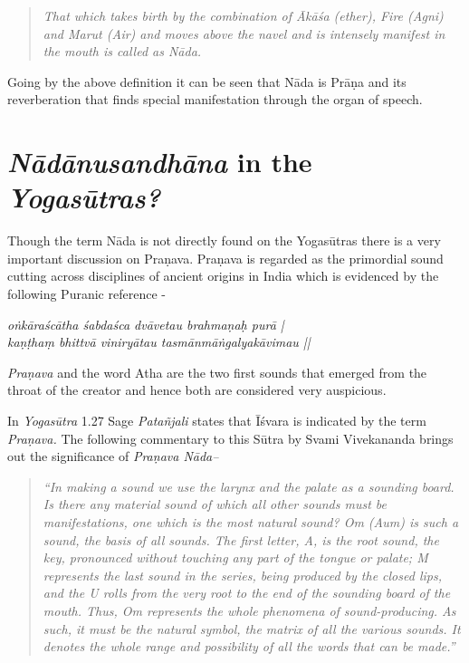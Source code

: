 \begin{quote}
\textit{That which takes birth by the combination of Ākāśa (ether), Fire (Agni) and  Marut (Air) and moves above the navel and is intensely manifest in the mouth is called as Nāda.}
\end{quote}

Going by the above definition it can be seen that Nāda is Prāṇa and its reverberation that finds special manifestation through the organ of speech. 
  
\section*{\textit{Nādānusandhāna} in the \textit{Yogasūtras?}}

Though the term Nāda is not directly found on the Yogasūtras there is a very important discussion on Praṇava. Praṇava is regarded as the primordial sound cutting across disciplines of ancient origins in India which is evidenced by the following Puranic reference -

\begin{shloka}
\textit{oṅkāraścātha śabdaśca dvāvetau brahmaṇaḥ purā |}\\
\textit{kaṇṭhaṃ bhittvā viniryātau tasmānmāṅgalyakāvimau ||}\\
\end{shloka}

\textit{Praṇava} and the word Atha are the two first sounds that emerged from the throat of the creator and hence both are considered very auspicious.

In \textit{Yogasūtra} 1.27 Sage \textit{Patañjali} states that Īśvara is indicated by the term \textit{Praṇava.} The following commentary to this Sūtra by Svami Vivekananda brings out the significance of \textit{Praṇava Nāda–} 

\begin{quote}
\textit{“In making a sound we use the larynx and the palate as a sounding board. Is there any material sound of which all other sounds must be manifestations, one which is the most natural sound? Om (Aum) is such a sound, the basis of all sounds. The first letter, A, is the root sound, the key, pronounced without touching any part of the tongue or palate; M represents the last sound in the series, being produced by the closed lips, and the U rolls from the very root to the end of the sounding board of the mouth. Thus, Om represents the whole phenomena of sound-producing. As such, it must be the natural symbol, the matrix of all the various sounds. It denotes the whole range and possibility of all the words that can be made.”}
\end{quote}

